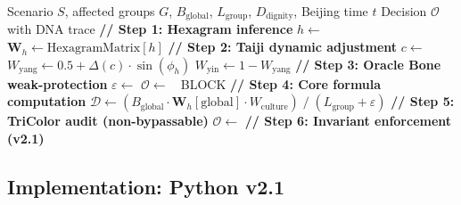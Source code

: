 \documentclass[conference]{IEEEtran}
\newcommand{\LH}{\textcolor{dragonRed}{\textbf{龍魂}}}
\begin{document}
\begin{algorithm}[t]
\caption{\LH{} Dynamic Weight Decision Algorithm v2.1}
\label{alg:main}
\begin{algorithmic}[1]
\Require Scenario $S$, affected groups $G$,
  $B_{\text{global}}$, $L_{\text{group}}$,
  $D_{\text{dignity}}$, Beijing time $t$
\Ensure Decision $\mathcal{O}$ with DNA trace
\State \textbf{// Step 1: Hexagram inference}
\State $h \gets$ 
\State $\mathbf{W}_h \gets \text{HexagramMatrix}[h]$
\State \textbf{// Step 2: Taiji dynamic adjustment}
\State $c \gets$ 
\State $W_{\text{yang}} \gets 0.5
  + \Delta(c)\cdot\sin(\phi_h)$
\State $W_{\text{yin}}  \gets 1 - W_{\text{yang}}$
\State \textbf{// Step 3: Oracle Bone weak-protection}
\State $\varepsilon \gets$
\If{$\varepsilon = +\infty$}
  \State $\mathcal{O} \gets$ 🔴 BLOCK
  \State \Return {}
\EndIf
\State \textbf{// Step 4: Core formula computation}
\State $\mathcal{D} \gets
  (B_{\text{global}} \cdot \mathbf{W}_h[\text{global}]
   \cdot W_{\text{culture}})
  \;/\;
  (L_{\text{group}} + \varepsilon)$
\State \textbf{// Step 5: TriColor audit (non-bypassable)}
\State $\mathcal{O} \gets$
\State \textbf{// Step 6: Invariant enforcement (v2.1)}
\State {}
\State \Return {}
\end{algorithmic}
\end{algorithm}

\subsection{Implementation: Python v2.1}
\end{document}
